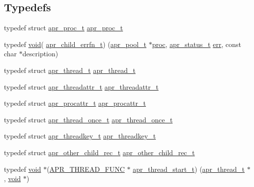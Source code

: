 \subsection*{Typedefs}
\begin{DoxyCompactItemize}
\item 
typedef struct \hyperlink{structapr__proc__t}{apr\+\_\+proc\+\_\+t} \hyperlink{group__apr__thread__proc_gada60ec0f833048291d98e66f21f4c4c4}{apr\+\_\+proc\+\_\+t}
\item 
typedef \hyperlink{group__MOD__ISAPI_gacd6cdbf73df3d9eed42fa493d9b621a6}{void}( \hyperlink{group__apr__thread__proc_ga428aa21a05476068f95d9ee30d1b420a}{apr\+\_\+child\+\_\+errfn\+\_\+t}) (\hyperlink{structapr__pool__t}{apr\+\_\+pool\+\_\+t} $\ast$\hyperlink{group__apr__thread__proc_ga0872b22b4085e3dafcc7002d15b30010}{proc}, \hyperlink{group__apr__errno_gaa5105fa83cc322f09382292db8b47593}{apr\+\_\+status\+\_\+t} \hyperlink{group__apr__thread__proc_ga156fcecee9d33dd7b55c3d8fdaba7159}{err}, const char $\ast$description)
\item 
typedef struct \hyperlink{structapr__thread__t}{apr\+\_\+thread\+\_\+t} \hyperlink{group__apr__thread__proc_ga646c71351e723d84f8cc8c8d1d5937be}{apr\+\_\+thread\+\_\+t}
\item 
typedef struct \hyperlink{structapr__threadattr__t}{apr\+\_\+threadattr\+\_\+t} \hyperlink{group__apr__thread__proc_ga35de571e9944871c10b38d8feef885ac}{apr\+\_\+threadattr\+\_\+t}
\item 
typedef struct \hyperlink{structapr__procattr__t}{apr\+\_\+procattr\+\_\+t} \hyperlink{group__apr__thread__proc_ga0d83919a6a0dd609598a864917f8b339}{apr\+\_\+procattr\+\_\+t}
\item 
typedef struct \hyperlink{structapr__thread__once__t}{apr\+\_\+thread\+\_\+once\+\_\+t} \hyperlink{group__apr__thread__proc_ga91841bcf20d0579e8e6acc6d3c220ac1}{apr\+\_\+thread\+\_\+once\+\_\+t}
\item 
typedef struct \hyperlink{structapr__threadkey__t}{apr\+\_\+threadkey\+\_\+t} \hyperlink{group__apr__thread__proc_ga337c9c1bd2d47740022071a5c41f2edb}{apr\+\_\+threadkey\+\_\+t}
\item 
typedef struct \hyperlink{structapr__other__child__rec__t}{apr\+\_\+other\+\_\+child\+\_\+rec\+\_\+t} \hyperlink{group__apr__thread__proc_gafc52ee8b19a7b222278d31ebb3f11a71}{apr\+\_\+other\+\_\+child\+\_\+rec\+\_\+t}
\item 
typedef \hyperlink{group__MOD__ISAPI_gacd6cdbf73df3d9eed42fa493d9b621a6}{void} $\ast$(\hyperlink{group__apr__platform_gade8f829f9bd98fd4386894acf72edd7c}{A\+P\+R\+\_\+\+T\+H\+R\+E\+A\+D\+\_\+\+F\+U\+NC} $\ast$ \hyperlink{group__apr__thread__proc_gaa1f88d2a6fe971ac200e466cae5f63e0}{apr\+\_\+thread\+\_\+start\+\_\+t}) (\hyperlink{structapr__thread__t}{apr\+\_\+thread\+\_\+t} $\ast$, \hyperlink{group__MOD__ISAPI_gacd6cdbf73df3d9eed42fa493d9b621a6}{void} $\ast$)
\end{DoxyCompactItemize}
